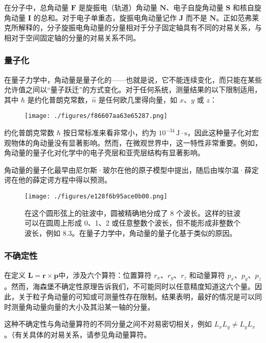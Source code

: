 在分子中，总角动量 \( \mathbf{F} \) 是旋振电（轨道）角动量 \( \mathbf{N} \)、电子自旋角动量 \( \mathbf{S} \) 和核自旋角动量 \( \mathbf{I} \) 的总和。对于电子单重态，旋振电角动量记作 \( \mathbf{J} \) 而不是 \( \mathbf{N} \)。正如范弗莱克所解释的，分子旋振电角动量的分量相对于分子固定轴具有不同的对易关系，与相对于空间固定轴的分量的对易关系不同。
\subsubsection{量子化}  
在量子力学中，角动量是量子化的——也就是说，它不能连续变化，而只能在某些允许值之间以“量子跃迁”的方式变化。对于任何系统，测量结果的以下限制适用，其中 \( \hbar \) 是约化普朗克常数，\( \hat{n} \) 是任何欧几里得向量，如 \( x \)、\( y \) 或 \( z \)：
\begin{figure}[ht]
\centering
\texttt{[image: ./figures/f86607aa63e65287.png]}
\caption{} \label{fig_JDL_13}
\end{figure}
约化普朗克常数 \( \hbar \) 按日常标准来看非常小，约为 \( 10^{-34} \, \text{J} \cdot \text{s} \)，因此这种量子化对宏观物体的角动量没有显著影响。然而，在微观世界中，这一特性非常重要。例如，角动量的量子化对化学中的电子壳层和亚壳层结构有显著影响。

角动量的量子化最早由尼尔斯·玻尔在他的原子模型中提出，随后由埃尔温·薛定谔在他的薛定谔方程中得以预测。
\begin{figure}[ht]
\centering
\texttt{[image: ./figures/e128f6b95ace0b00.png]}
\caption{在这个圆形弦上的驻波中，圆被精确地分成了 8 个波长。这样的驻波可以在圆周上形成 0、1、2 或任意整数个波长，但不能形成非整数个波长，例如 8.3。在量子力学中，角动量的量子化基于类似的原因。} \label{fig_JDL_14}
\end{figure}
\subsubsection{不确定性}
在定义 \(\mathbf{L} = \mathbf{r} \times \mathbf{p}\)中，涉及六个算符：位置算符 \( r_x \)、\( r_y \)、\( r_z \) 和动量算符 \( p_x \)、\( p_y \)、\( p_z \)。然而，海森堡不确定性原理告诉我们，不可能同时以任意精度知道这六个量。因此，关于粒子角动量的可知或可测量性存在限制。结果表明，最好的情况是可以同时测量角动量向量的大小及其沿某一轴的分量。

这种不确定性与角动量算符的不同分量之间不对易密切相关，例如 \( L_x L_y \neq L_y L_x \)。（有关具体的对易关系，请参见角动量算符。
